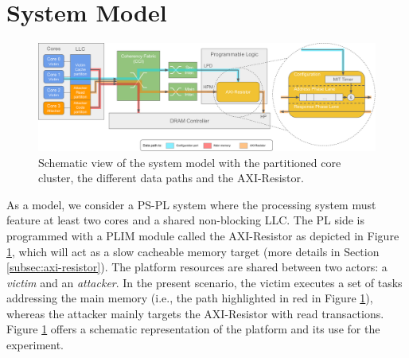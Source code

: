 \section{System Model}
    \label{sec:system_model}
    \begin{figure}
        \centering
        \includegraphics[scale=0.56]{images/Evaluation_setup.pdf}
        \caption{Schematic view of the system model with the partitioned core cluster, the different data paths and the AXI-Resistor.}
        \label{fig:system_schematic}
    \end{figure}


    As a model, we consider a PS-PL system where the processing system must feature at least two cores and a shared non-blocking LLC.
    The PL side is programmed with a PLIM module called the AXI-Resistor as depicted in Figure \ref{fig:system_schematic}, which will act as a slow cacheable memory target (more details in Section \ref{subsec:axi-resistor}).
    The platform resources are shared between two actors: a \emph{victim} and an \emph{attacker}.
    In the present scenario, the victim executes a set of tasks addressing the main memory (i.e., the path highlighted in red in Figure \ref{fig:system_schematic}), whereas the attacker mainly targets the AXI-Resistor with read transactions.
    Figure \ref{fig:system_schematic} offers a schematic representation of the platform and its use for the experiment.

